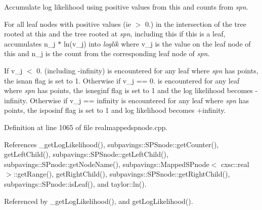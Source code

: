 \-Accumulate log likelihood using positive values from this and counts from {\itshape spn\/}. 

\-For all leaf nodes with positive values (ie $>$ 0.) in the intersection of the tree rooted at this and the tree rooted at {\itshape spn\/}, including this if this is a leaf, accumulates n\-\_\-j $\ast$ ln(v\-\_\-j) into {\itshape loglik\/} where v\-\_\-j is the value on the leaf node of this and n\-\_\-j is the count from the corresponding leaf node of {\itshape spn\/}.

\-If v\-\_\-j $<$ 0. (including -\/infinity) is encountered for any leaf where {\itshape spn\/} has points, the isnan flag is set to 1. \-Otherwise if v\-\_\-j == 0. is encountered for any leaf where {\itshape spn\/} has points, the isneginf flag is set to 1 and the log likelihood becomes -\/infinity. \-Otherwise if v\-\_\-j == infinity is encountered for any leaf where {\itshape spn\/} has points, the isposinf flag is set to 1 and log likelihood becomes +infinity. 

\-Definition at line 1065 of file realmappedspnode.\-cpp.



\-References \-\_\-get\-Log\-Likelihood(), subpavings\-::\-S\-P\-Snode\-::get\-Counter(), get\-Left\-Child(), subpavings\-::\-S\-P\-Snode\-::get\-Left\-Child(), subpavings\-::\-S\-Pnode\-::get\-Node\-Name(), subpavings\-::\-Mapped\-S\-Pnode$<$ cxsc\-::real $>$\-::get\-Range(), get\-Right\-Child(), subpavings\-::\-S\-P\-Snode\-::get\-Right\-Child(), subpavings\-::\-S\-Pnode\-::is\-Leaf(), and taylor\-::ln().



\-Referenced by \-\_\-get\-Log\-Likelihood(), and get\-Log\-Likelihood().


